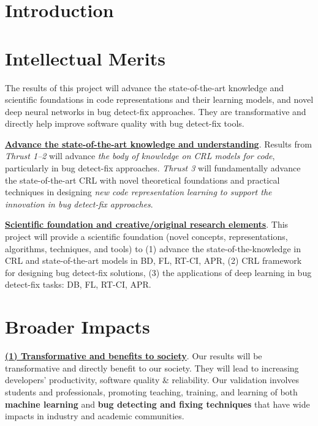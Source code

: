 \section{Introduction}








\section{Intellectual Merits}

The results of this project will advance the state-of-the-art
knowledge and scientific foundations in code representations and their
learning models, and novel deep neural networks in bug detect-fix
approaches. They are transformative and directly help improve software
quality with bug detect-fix tools.


\noindent \underline{{\bf Advance the state-of-the-art  knowledge and
  understanding}}. Results from {\em Thrust 1--2} will advance {\em the
  body of knowledge on CRL models for code}, particularly in bug
detect-fix approaches. {\em Thrust 3} will fundamentally advance the
state-of-the-art CRL with novel theoretical foundations and practical
techniques in designing {\em new code representation learning to support
the innovation in bug detect-fix approaches}.


\noindent \underline{{\bf Scientific foundation and creative/original research
  elements}}. This project will provide a scientific foundation (novel
concepts, representations, algorithms, techniques, and tools) to (1)
advance the state-of-the-knowledge in CRL and state-of-the-art models
in BD, FL, RT-CI, APR, (2) CRL framework for designing bug
detect-fix solutions, (3) the applications of deep
learning in bug detect-fix tasks: DB, FL, RT-CI, APR.

\section{Broader Impacts}

\underline{{\bf (1) Transformative and benefits to society}}. Our results will be
transformative and directly benefit to our society.  They will lead to
increasing developers' productivity, software quality \&
reliability.  Our validation involves students and professionals,
promoting teaching, training, and learning of both {\bf machine
  learning} and {\bf bug detecting and fixing techniques} that have
wide impacts in industry and academic communities.


